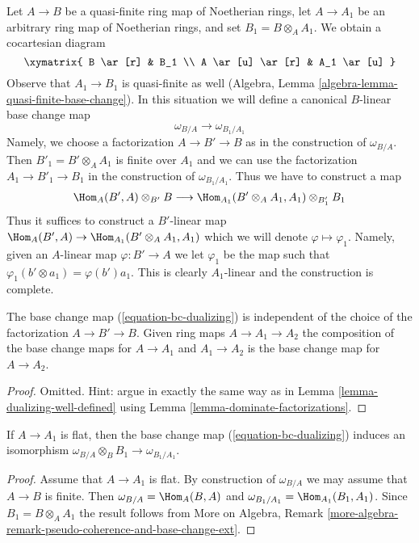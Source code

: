 \noindent
Let $A \to B$ be a quasi-finite ring map of Noetherian rings, let
$A \to A_1$ be an arbitrary ring map of Noetherian rings, and set
$B_1 = B \otimes_A A_1$. We obtain a cocartesian diagram
$$
\xymatrix{
B \ar[r] & B_1 \\
A \ar[u] \ar[r] & A_1 \ar[u]
}
$$
Observe that $A_1 \to B_1$ is quasi-finite as well (Algebra, Lemma
\ref{algebra-lemma-quasi-finite-base-change}).
In this situation we will define a canonical
$B$-linear base change map
\begin{equation}
\label{equation-bc-dualizing}
\omega_{B/A} \longrightarrow \omega_{B_1/A_1}
\end{equation}
Namely, we choose a factorization $A \to B' \to B$ as in the construction
of $\omega_{B/A}$. Then $B'_1 = B' \otimes_A A_1$ is finite over $A_1$
and we can use the factorization $A_1 \to B'_1 \to B_1$ in the construction
of $\omega_{B_1/A_1}$. Thus we have to construct a map
$$
\Hom_A(B', A) \otimes_{B'} B
\longrightarrow
\Hom_{A_1}(B' \otimes_A A_1, A_1) \otimes_{B'_1} B_1
$$
Thus it suffices to construct a $B'$-linear map
$\Hom_A(B', A) \to \Hom_{A_1}(B' \otimes_A A_1, A_1)$
which we will denote $\varphi \mapsto \varphi_1$.
Namely, given an $A$-linear map $\varphi : B' \to A$ we
let $\varphi_1$ be the map such that
$\varphi_1(b' \otimes a_1) = \varphi(b')a_1$.
This is clearly $A_1$-linear and the construction is complete.

\begin{lemma}
\label{lemma-bc-map-dualizing}
The base change map (\ref{equation-bc-dualizing})
is independent of the choice of the
factorization $A \to B' \to B$. Given ring maps $A \to A_1 \to A_2$
the composition of the base change maps for $A \to A_1$ and $A_1 \to A_2$
is the base change map for $A \to A_2$.
\end{lemma}

\begin{proof}
Omitted. Hint: argue in exactly the same way as in
Lemma \ref{lemma-dualizing-well-defined}
using Lemma \ref{lemma-dominate-factorizations}.
\end{proof}

\begin{lemma}
\label{lemma-dualizing-flat-base-change}
If $A \to A_1$ is flat, then
the base change map (\ref{equation-bc-dualizing}) induces an isomorphism
$\omega_{B/A} \otimes_B B_1 \to \omega_{B_1/A_1}$.
\end{lemma}

\begin{proof}
Assume that $A \to A_1$ is flat. By construction of $\omega_{B/A}$ we may
assume that $A \to B$ is finite. Then $\omega_{B/A} = \Hom_A(B, A)$ and
$\omega_{B_1/A_1} = \Hom_{A_1}(B_1, A_1)$. Since $B_1 = B \otimes_A A_1$
the result follows from More on Algebra, Remark
\ref{more-algebra-remark-pseudo-coherence-and-base-change-ext}.
\end{proof}

